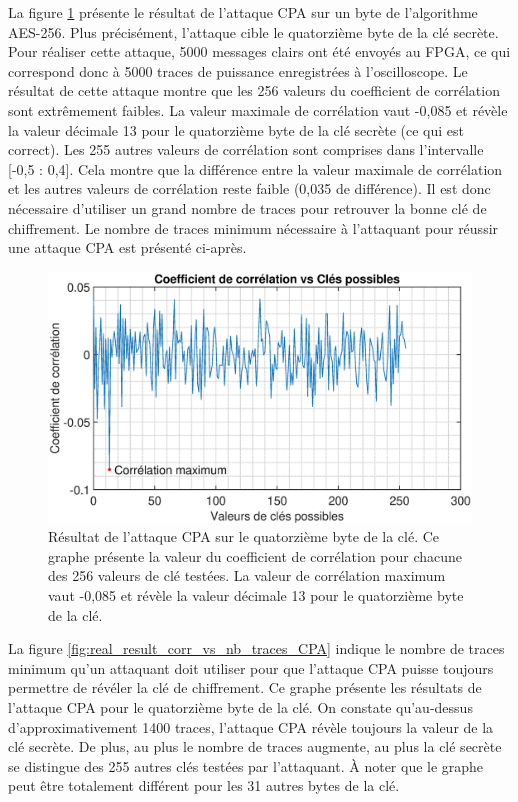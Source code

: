 \documentclass[oneside]{book}
\begin{document}
La figure \ref{fig:real_result_CPA} présente le résultat de l'attaque CPA sur un byte de l'algorithme AES-256. Plus précisément, l'attaque cible le quatorzième byte de la clé secrète. Pour réaliser cette attaque, 5000 messages clairs ont été envoyés au FPGA, ce qui correspond donc à 5000 traces de puissance enregistrées à l'oscilloscope. Le résultat de cette attaque montre que les 256 valeurs du coefficient de corrélation sont extrêmement faibles. La valeur maximale de corrélation vaut -0,085 et révèle la valeur décimale 13 pour le quatorzième byte de la clé secrète (ce qui est correct). Les 255 autres valeurs de corrélation sont comprises dans l'intervalle [-0,5 : 0,4]. Cela montre que la différence entre la valeur maximale de corrélation et les autres valeurs de corrélation reste faible (0,035 de différence). Il est donc nécessaire d'utiliser un grand nombre de traces pour retrouver la bonne clé de chiffrement. Le nombre de traces minimum nécessaire à l'attaquant pour réussir une attaque CPA est présenté ci-après.

\begin{figure}[ht!]
    \hspace{-1.8cm}
    \includegraphics[scale=0.6]{image/real_result_CPA}
    \caption{Résultat de l'attaque CPA sur le quatorzième byte de la clé. Ce graphe présente la valeur du coefficient de corrélation pour chacune des 256 valeurs de clé testées. La valeur de corrélation maximum vaut -0,085 et révèle la valeur décimale 13 pour le quatorzième byte de la clé.}
    \label{fig:real_result_CPA} 
\end{figure}
\FloatBarrier 

La figure \ref{fig:real_result_corr_vs_nb_traces_CPA} indique le nombre de traces minimum qu'un attaquant doit utiliser pour que l'attaque CPA puisse toujours permettre de révéler la clé de chiffrement. Ce graphe présente les résultats de l'attaque CPA pour le quatorzième byte de la clé. On constate qu'au-dessus d'approximativement 1400 traces, l'attaque CPA révèle toujours la valeur de la clé secrète. De plus, au plus le nombre de traces augmente, au plus la clé secrète se distingue des 255 autres clés testées par l'attaquant. À noter que le graphe peut être totalement différent pour les 31 autres bytes de la clé.
\end{document}
